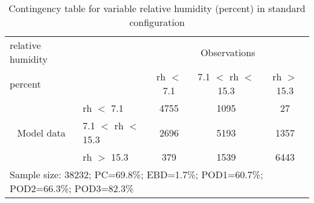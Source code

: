 \begin{table}[]
\begin{center}
\begin{tabular}{llccc}
\hline
{relative humidity}                                       &                                                    & \multicolumn{3}{c}{Observations}                 \\
{percent}                                       &                             & rh $<$ 7.1   & 7.1 $<$ rh $<$ 15.3 & rh $>$ 15.3 \\
\hline
\multicolumn{1}{c}{\multirow{3}{*}{Model data}}  & rh $<$ 7.1             & 4755                & 1095                       & 27              \\
                                                 & 7.1  $<$ rh $<$ 15.3 & 2696                & 5193                       & 1357              \\
                                                 & rh $>$ 15.3             & 379                & 1539                       & 6443              \\
\hline
\multicolumn{5}{l}{Sample size: 38232; PC=69.8\%; EBD=1.7\%; POD1=60.7\%; POD2=66.3\%; POD3=82.3\%}
\end{tabular}
\end{center}
\caption{Contingency table for variable relative humidity (percent) in standard configuration}
\label{tab:contingencyrhBEF}
\end{table}
